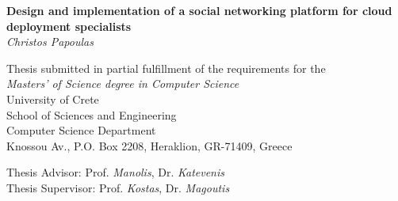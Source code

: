 \begin{titlepage}
\begin{center}

\LARGE \textbf{Design and implementation of a social networking platform for cloud deployment specialists}\\[0.5cm]
\LARGE \textit{Christos Papoulas}\\[0.5cm]

\vfill

\normalsize{
Thesis submitted in partial fulfillment of the requirements for the\\[0.30cm]

\textit{Masters' of Science degree in Computer Science}}\\[0.30cm]

University of Crete\\
School of Sciences and Engineering\\
Computer Science Department\\
Knossou Av., P.O. Box 2208, Heraklion, GR-71409, Greece\\[0.5cm]

\vfill

\Large{Thesis Advisor: Prof. \emph{Manolis}, Dr. \emph{Katevenis}}\\[0.5cm]
\Large{Thesis Supervisor: Prof. \emph{Kostas}, Dr. \emph{Magoutis}}\\[0.5cm]
\vfill

\end{center}

\end{titlepage}
